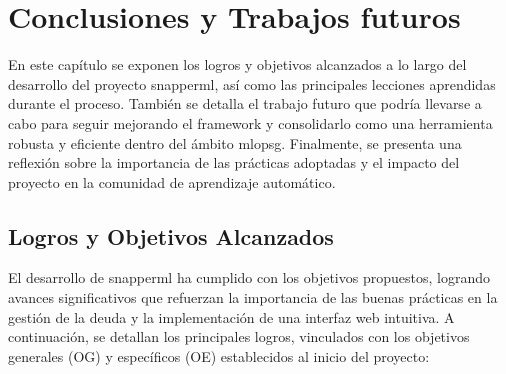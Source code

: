 \chapter{Conclusiones y Trabajos futuros}
En este capítulo se exponen los logros y objetivos alcanzados a lo largo del desarrollo del proyecto \Gls{snapperml}, así como las principales lecciones aprendidas durante el proceso. También se detalla el trabajo futuro que podría llevarse a cabo para seguir mejorando el \gls{framework} y consolidarlo como una herramienta robusta y eficiente dentro del ámbito \Gls{mlopsg}. Finalmente, se presenta una reflexión sobre la importancia de las prácticas adoptadas y el impacto del proyecto en la comunidad de aprendizaje automático.

\section{Logros y Objetivos Alcanzados}
El desarrollo de \Gls{snapperml} ha cumplido con los objetivos propuestos, logrando avances significativos que refuerzan la importancia de las buenas prácticas en la gestión de la \gls{deuda} y la implementación de una interfaz web intuitiva. A continuación, se detallan los principales logros, vinculados con los objetivos generales (OG) y específicos (OE) establecidos al inicio del proyecto:

